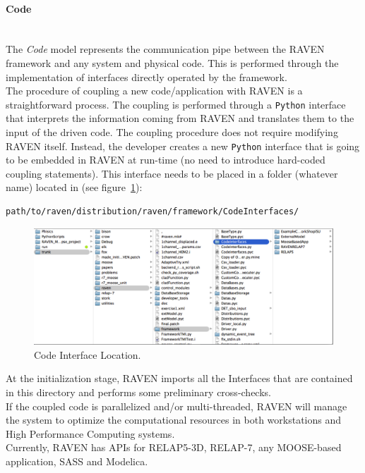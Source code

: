 \paragraph{Code} ~\\ 
The \textit{Code} model represents the communication pipe between the RAVEN framework and any system and physical code. This is performed through the implementation of interfaces directly operated by the framework. 
\\The procedure of coupling a new code/application with RAVEN is a straightforward process. The coupling is performed through a \texttt{Python}  interface that interprets the information coming from RAVEN and translates them to the input of the driven code. The coupling procedure does not require modifying RAVEN itself. Instead, the developer creates a new \texttt{Python} interface that is going to be embedded in RAVEN at run-time (no need to introduce hard-coded coupling statements).  This interface needs to be placed in a folder (whatever name) located in (see figure~\ref{fig:CodeInterfaceLocation}):
\begin{lstlisting}[language=bash]
 path/to/raven/distribution/raven/framework/CodeInterfaces/
\end{lstlisting}

\begin{figure}
  \centering
  \includegraphics[width=1\textwidth]  {pics/CodeInterfaceLocation.png}
  \caption{Code Interface Location.}
  \label{fig:CodeInterfaceLocation}
\end{figure}
At the initialization stage, RAVEN imports all the Interfaces that are contained in this directory and performs some preliminary cross-checks. 
\\ If the coupled code is parallelized and/or multi-threaded, RAVEN will manage the system to optimize the computational resources in both workstations and High Performance Computing systems.
\\Currently, RAVEN has APIs for RELAP5-3D, RELAP-7, any MOOSE-based application, SASS and Modelica.
